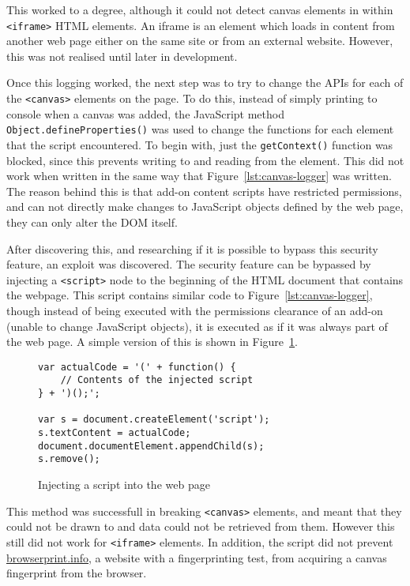 This worked to a degree, although it could not detect canvas elements in within \texttt{<iframe>} HTML elements.
An iframe is an element which loads in content from another web page either on the same site or from an external website.
However, this was not realised until later in development.

Once this logging worked, the next step was to try to change the APIs for each of the \texttt{<canvas>} elements on the page.
To do this, instead of simply printing to console when a canvas was added, the JavaScript method \texttt{Object.defineProperties()} was used to change the functions for each element that the script encountered.
To begin with, just the \texttt{getContext()} function was blocked, since this prevents writing to and reading from the element.
This did not work when written in the same way that Figure~\ref{lst:canvas-logger} was written.
The reason behind this is that add-on content scripts have restricted permissions, and can not directly make changes to JavaScript objects defined by the web page, they can only alter the DOM itself.

After discovering this, and researching if it is possible to bypass this security feature, an exploit was discovered.
The security feature can be bypassed by injecting a \texttt{<script>} node to the beginning of the HTML document that contains the webpage.
This script contains similar code to Figure~\ref{lst:canvas-logger}, though instead of being executed with the permissions clearance of an add-on (unable to change JavaScript objects), it is executed as if it was always part of the web page.
A simple version of this is shown in Figure~\ref{lst:injection}.

\begin{figure}[h]
\begin{lstlisting}
var actualCode = '(' + function() {
    // Contents of the injected script
} + ')();';

var s = document.createElement('script');
s.textContent = actualCode;
document.documentElement.appendChild(s);
s.remove();
\end{lstlisting}
\caption{Injecting a script into the web page}
\label{lst:injection}
\end{figure}

This method was successfull in breaking \texttt{<canvas>} elements, and meant that they could not be drawn to and data could not be retrieved from them.
However this still did not work for \texttt{<iframe>} elements.
In addition, the script did not prevent \url{browserprint.info}, a website with a fingerprinting test, from acquiring a canvas fingerprint from the browser.

